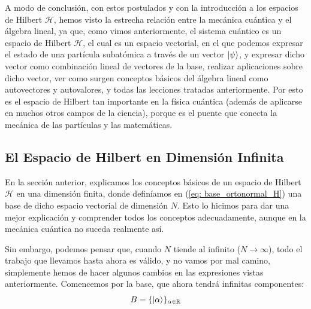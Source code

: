 \documentclass[12pt]{article}
\numberwithin{equation}{section} %
\begin{document}
    \vspace{5mm}

    A modo de conclusión, con estos postulados y con la introducción a los espacios de Hilbert \( \mathcal{H} \), hemos visto la estrecha relación entre la mecánica cuántica y el álgebra lineal, ya que, como vimos anteriormente, el sistema cuántico es un espacio de Hilbert \( \mathcal{H} \), el cual es un espacio vectorial, en el que podemos expresar el estado de una partícula subatómica a través de un vector \( \ket{\psi} \), y expresar dicho vector como combinación lineal de vectores de la base, realizar aplicaciones sobre dicho vector, ver como surgen conceptos básicos del álgebra lineal como autovectores y autovalores, y todas las lecciones tratadas anteriormente. Por esto es el espacio de Hilbert tan importante en la física cuántica (además de aplicarse en muchos otros campos de la ciencia), porque es el puente que conecta la mecánica de las partículas y las matemáticas.

    \vspace{10mm}





    \subsection{El Espacio de Hilbert en Dimensión Infinita}

    \vspace{5mm}

    En la sección anterior, explicamos los conceptos básicos de un espacio de Hilbert \( \mathcal{H} \) en una dimensión finita, donde definíamos en (\ref{eq: base_ortonormal_H}) una base de dicho espacio vectorial de dimensión \( N \). Esto lo hicimos para dar una mejor explicación y comprender todos los conceptos adecuadamente, aunque en la mecánica cuántica no suceda realmente así. 

    \vspace{5mm}

    Sin embargo, podemos pensar que, cuando \( N \) tiende al infinito (\( N \rightarrow \infty \)), todo el trabajo que llevamos hasta ahora es válido, y no vamos por mal camino, simplemente hemos de hacer algunos cambios en las expresiones vistas anteriormente. Comencemos por la base, que ahora tendrá infinitas componentes:
    \begin{equation}
        B = \{ \ket{\alpha} \} _{\alpha \in \mathbb{R}}
        \label{eq: base_ortonormal_L2}
    \end{equation} 
\end{document}
